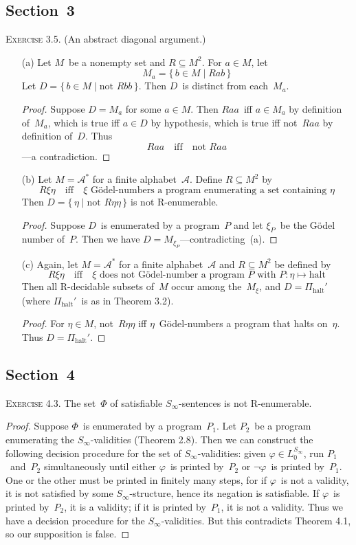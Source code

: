 \documentclass[letterpaper]{article}
\theoremstyle{remark}
\begin{document}
\subsection*{Section~3}
\noindent\textsc{Exercise 3.5.}
(An abstract diagonal argument.)
\begin{enumerate}
\item[(a)] Let $M$~be a nonempty set and $R\subseteq M^2$. For $a\in M$, let
$$M_a=\{\,b\in M\mid Rab\,\}$$
Let $D=\{\,b\in M\mid\text{not } Rbb\,\}$. Then $D$~is distinct from each~$M_a$.
\begin{proof}
Suppose $D=M_a$ for some $a\in M$. Then $Raa$~iff $a\in M_a$ by definition of~$M_a$, which is true iff $a\in D$ by hypothesis, which is true iff not~$Raa$ by definition of~$D$. Thus
$$Raa\quad\text{iff}\quad\text{not }Raa$$
---a contradiction.
\end{proof}
\item[(b)] Let $M=\mathcal{A}^*$ for a finite alphabet~$\mathcal{A}$. Define $R\subseteq M^2$ by
$$R\xi\eta\quad\text{iff}\quad\text{$\xi $~G\"odel-numbers a program enumerating a set containing~$\eta $}$$
Then $D=\{\,\eta\mid\text{not } R\eta\eta\,\}$ is not R-enumerable.
\begin{proof}
Suppose $D$~is enumerated by a program~$P$ and let $\xi_P$~be the G\"odel number of~$P$. Then we have $D=M_{\xi_P}$---contradicting~(a).
\end{proof}
\item[(c)] Again, let $M=\mathcal{A}^*$ for a finite alphabet~$\mathcal{A}$ and $R\subseteq M^2$ be defined by
$$R\xi\eta\quad\text{iff}\quad\text{$\xi $~does not G\"odel-number a program~$P$ with $P:\eta\mapsto\text{halt}$}$$
Then all R-decidable subsets of~$M$ occur among the~$M_{\xi}$, and $D=\Pi_{\text{halt}}'$ (where $\Pi_{\text{halt}}'$~is as in Theorem 3.2).
\begin{proof}
For $\eta\in M$, not~$R\eta\eta$ iff $\eta$~G\"odel-numbers a program that halts on~$\eta$. Thus $D=\Pi_{\text{halt}}'$.
\end{proof}
\end{enumerate}

\subsection*{Section~4}
\noindent\textsc{Exercise 4.3.}
The set~$\Phi$ of satisfiable $S_\infty$-sentences is not R-enumerable.
\begin{proof}
Suppose $\Phi$~is enumerated by a program~$P_1$. Let $P_2$~be a program enumerating the $S_\infty$-validities (Theorem 2.8). Then we can construct the following decision procedure for the set of $S_\infty$-validities: given $\varphi\in L_0^{S_\infty}$, run $P_1$~and~$P_2$ simultaneously until either $\varphi$~is printed by~$P_2$ or $\lnot\varphi$~is printed by~$P_1$. One or the other must be printed in finitely many steps, for if $\varphi$~is not a validity, it is not satisfied by some $S_\infty$-structure, hence its negation is satisfiable. If $\varphi$~is printed by~$P_2$, it is a validity; if it is printed by~$P_1$, it is not a validity. Thus we have a decision procedure for the $S_\infty$-validities. But this contradicts Theorem 4.1, so our supposition is false.
\end{proof}
\end{document}
